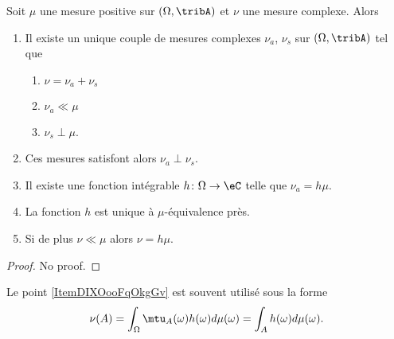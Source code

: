 \begin{theorem}\label{ThoZZMGooKhRYaO}
    Soit \( \mu\) une mesure positive sur \( (\Omega,\tribA)\) et \( \nu\) une mesure complexe. Alors
    \begin{enumerate}
        \item
            Il existe un unique couple de mesures complexes \( \nu_a\), \( \nu_s\) sur \( (\Omega,\tribA)\) tel que
            \begin{enumerate}
                \item
                    \( \nu=\nu_a+\nu_s\)
                \item
                    \( \nu_a\ll\mu\)
                \item
                    \( \nu_s\perp \mu\).
            \end{enumerate}
        \item
            Ces mesures satisfont alors \( \nu_a\perp\nu_s\).
        \item
            Il existe une fonction intégrable \( h\colon \Omega\to \eC\) telle que \( \nu_a=h\mu\).
        \item
            La fonction \( h\) est unique à \( \mu\)-équivalence près.
        \item   \label{ItemDIXOooFqOkgGv}
            Si de plus \( \nu\ll \mu\) alors \( \nu=h\mu\).
    \end{enumerate}
\end{theorem}
\begin{proof}
    No proof.
\end{proof}

\begin{remark}  \label{RemSYRMooZPBhbQ}
    Le point \ref{ItemDIXOooFqOkgGv} est souvent utilisé sous la forme
    \begin{equation}
        \nu(A)=\int_{\Omega}\mtu_A(\omega)h(\omega)d\mu(\omega)=\int_{A}h(\omega)d\mu(\omega).
    \end{equation}
\end{remark}

